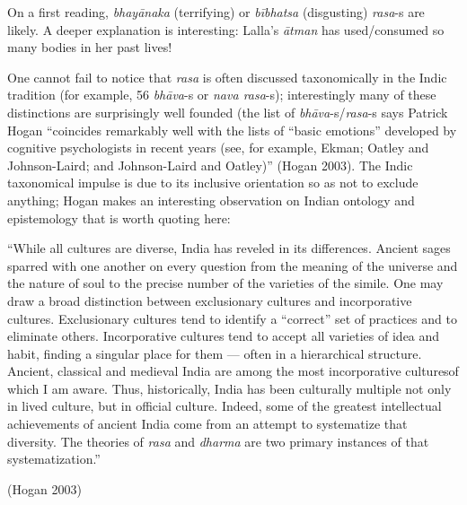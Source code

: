 On a first reading, \textsl{bhayānaka} (terrifying) or \textsl{bībhatsa} (disgusting) \textsl{rasa}-s are likely. A deeper explanation is interesting: Lalla’s \textsl{ātman} has used/consumed so many bodies in her past lives!

One cannot fail to notice that \textsl{rasa} is often discussed taxonomically in the Indic tradition (for example, 56 \textsl{bhāva}-s or \textsl{nava rasa}-s); interestingly many of these distinctions are surprisingly well founded (the list of \textsl{bhāva}-s/\textsl{rasa}-s says Patrick Hogan “coincides remarkably well with the lists of “basic emotions” developed by cognitive psychologists in recent years (see, for example, Ekman; Oatley and Johnson-Laird; and Johnson-Laird and Oatley)” (Hogan 2003). The Indic taxonomical impulse is due to its inclusive orientation so as not to exclude anything; Hogan makes an interesting observation on Indian ontology and epistemology that is worth quoting here:

\begin{myquote}
“While all cultures are diverse, India has reveled in its differences. Ancient sages sparred with one another on every question from the meaning of the universe and the nature of soul to the precise number of the varieties of the simile. One may draw a broad distinction between exclusionary cultures and incorporative cultures. Exclusionary cultures tend to identify a “correct” set of practices and to eliminate others. Incorporative cultures tend to accept all varieties of idea and habit, finding a singular place for them — often in a hierarchical structure. Ancient, classical and medieval India are among the most incorporative culturesof which I am aware. Thus, historically, India has been culturally multiple not only in lived culture, but in official culture. Indeed, some of the greatest intellectual achievements of ancient India come from an attempt to systematize that diversity. The theories of \textsl{rasa} and \textsl{dharma} are two primary instances of that systematization.”  

\hfill(Hogan 2003)
\end{myquote}

